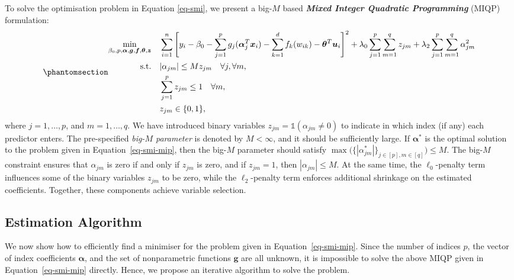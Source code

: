 \documentclass[
  11pt,
  a4paper,
]{article}
\begin{document}
To solve the optimisation problem in Equation \ref{eq-smi}, we present a
big-\(M\) based \textbf{\emph{Mixed Integer Quadratic Programming}}
(MIQP) formulation: \begin{equation}\phantomsection\label{eq-smi-mip}{
\begin{aligned}
  \min_{\beta_{0}, p, \bm{\alpha}, \bm{g}, \bm{f}, \bm{\theta}, \bm{z}} \quad & \sum_{i = 1}^{n}\Bigg [ y_{i} - \beta_{0} - \sum_{j = 1}^{p}{g_{j}(\bm{\alpha}_{j}^{T}\bm{x}_{i})} - \sum_{k = 1}^{d} {f_{k}(w_{ik})} - \bm{\theta}^{T}\bm{u}_{i}\Bigg ]^{2} + \lambda_{0}\sum_{j = 1}^{p}\sum_{m = 1}^{q}z_{jm} + \lambda_{2}\sum_{j = 1}^{p}\sum_{m = 1}^{q} \alpha_{jm}^{2} \\
  \text{s.t.} \quad & |\alpha_{jm}| \le Mz_{jm} \quad \forall j, \forall m, \\
  & \sum_{j = 1}^{p}z_{jm} \le 1 \quad \forall m, \\
  & z_{jm} \in \{0, 1\},
\end{aligned}
}\end{equation} where \(j = 1, \dots, p\), and \(m = 1, \dots, q\). We
have introduced binary variables
\(z_{jm} = \mathbb{1}(\alpha_{jm} \neq 0)\) to indicate in which index
(if any) each predictor enters. The pre-specified \emph{big-\(M\)
parameter} is denoted by \(M < \infty\), and it should be sufficiently
large. If \(\bm{\alpha^{*}}\) is the optimal solution to the problem
given in Equation~\ref{eq-smi-mip}, then the big-\(M\) parameter should
satisfy
\(\max \big ( \{|\alpha_{jm}^{*} |\}_{j\in[p],m\in[q]} \big) \le M\).
The big-\(M\) constraint ensures that \(\alpha_{jm}\) is zero if and
only if \(z_{jm}\) is zero, and if \(z_{jm} = 1\), then
\(|\alpha_{jm}| \le M\). At the same time, the \(\ell_{0}\)-penalty term
influences some of the binary variables \(z_{jm}\) to be zero, while the
\(\ell_{2}\)-penalty term enforces additional shrinkage on the estimated
coefficients. Together, these components achieve variable selection.

\subsection{Estimation Algorithm}\label{estimation-algorithm}

We now show how to efficiently find a minimiser for the problem given in
Equation~\ref{eq-smi-mip}. Since the number of indices \(p\), the vector
of index coefficients \(\bm{\alpha}\), and the set of nonparametric
functions \(\bm{g}\) are all unknown, it is impossible to solve the
above MIQP given in Equation~\ref{eq-smi-mip} directly. Hence, we
propose an iterative algorithm to solve the problem.
\end{document}
